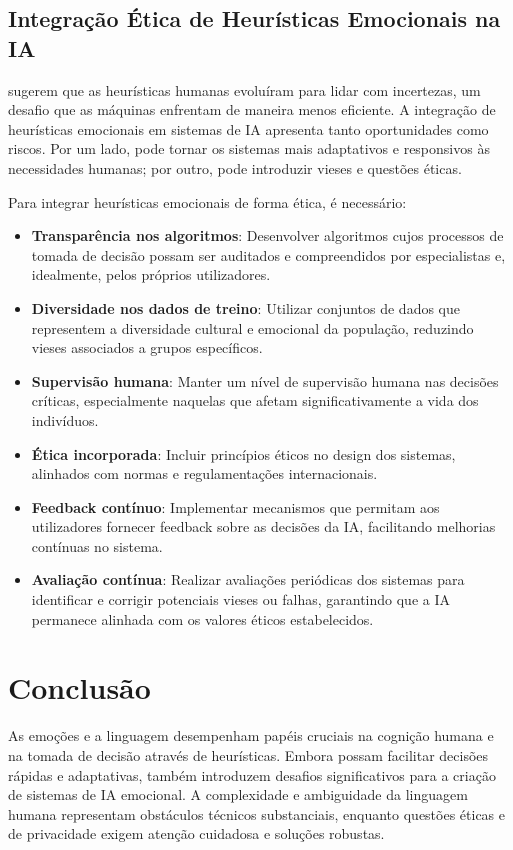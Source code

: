 \documentclass[a4paper,12pt]{report}
\begin{document}
	\subsection{Integração Ética de Heurísticas Emocionais na IA}
	
	\textcite{gigerenzer2009} sugerem que as heurísticas humanas evoluíram para lidar com incertezas, um desafio que as máquinas enfrentam de maneira menos eficiente. A integração de heurísticas emocionais em sistemas de IA apresenta tanto oportunidades como riscos. Por um lado, pode tornar os sistemas mais adaptativos e responsivos às necessidades humanas; por outro, pode introduzir vieses e questões éticas.
	
	Para integrar heurísticas emocionais de forma ética, é necessário:
	
	\begin{itemize}
		\item \textbf{Transparência nos algoritmos}: Desenvolver algoritmos cujos processos de tomada de decisão possam ser auditados e compreendidos por especialistas e, idealmente, pelos próprios utilizadores.
		\item \textbf{Diversidade nos dados de treino}: Utilizar conjuntos de dados que representem a diversidade cultural e emocional da população, reduzindo vieses associados a grupos específicos.
		\item \textbf{Supervisão humana}: Manter um nível de supervisão humana nas decisões críticas, especialmente naquelas que afetam significativamente a vida dos indivíduos.
		\item \textbf{Ética incorporada}: Incluir princípios éticos no design dos sistemas, alinhados com normas e regulamentações internacionais.
		\item \textbf{Feedback contínuo}: Implementar mecanismos que permitam aos utilizadores fornecer feedback sobre as decisões da IA, facilitando melhorias contínuas no sistema.
		\item \textbf{Avaliação contínua}: Realizar avaliações periódicas dos sistemas para identificar e corrigir potenciais vieses ou falhas, garantindo que a IA permanece alinhada com os valores éticos estabelecidos.
	\end{itemize}
	
	\section{Conclusão}
	
	As emoções e a linguagem desempenham papéis cruciais na cognição humana e na tomada de decisão através de heurísticas. Embora possam facilitar decisões rápidas e adaptativas, também introduzem desafios significativos para a criação de sistemas de IA emocional. A complexidade e ambiguidade da linguagem humana representam obstáculos técnicos substanciais, enquanto questões éticas e de privacidade exigem atenção cuidadosa e soluções robustas.
	
\end{document}
